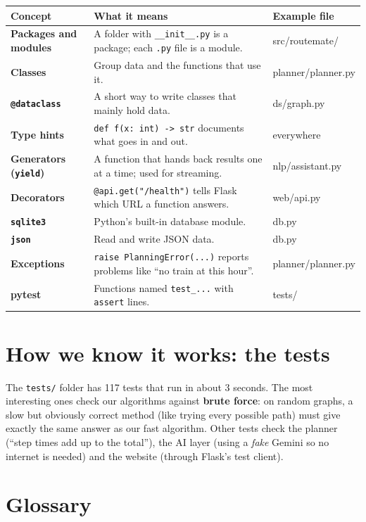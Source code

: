 \documentclass[11pt,a4paper]{article}
\newcommand{\file}[1]{\texttt{\color{accent}#1}}
\begin{document}
\begin{tabularx}{\linewidth}{@{}>{\bfseries}l X >{\ttfamily\small\color{accent}}l@{}}
\toprule
Concept & What it means & \normalfont\textbf{Example file} \\
\midrule
Packages and modules & A folder with \texttt{\_\_init\_\_.py} is a package; each \texttt{.py} file is a module. & src/routemate/ \\
Classes & Group data and the functions that use it. & planner/planner.py \\
\texttt{@dataclass} & A short way to write classes that mainly hold data. & ds/graph.py \\
Type hints & \texttt{def f(x: int) -> str} documents what goes in and out. & everywhere \\
Generators (\texttt{yield}) & A function that hands back results one at a time; used for streaming. & nlp/assistant.py \\
Decorators & \texttt{@api.get("/health")} tells Flask which URL a function answers. & web/api.py \\
\texttt{sqlite3} & Python's built-in database module. & db.py \\
\texttt{json} & Read and write JSON data. & db.py \\
Exceptions & \texttt{raise PlanningError(...)} reports problems like ``no train at this hour''. & planner/planner.py \\
pytest & Functions named \texttt{test\_...} with \texttt{assert} lines. & tests/ \\
\bottomrule
\end{tabularx}

\section{How we know it works: the tests}

The \file{tests/} folder has 117 tests that run in about 3 seconds. The most interesting ones
check our algorithms against \textbf{brute force}: on random graphs, a slow but obviously
correct method (like trying every possible path) must give exactly the same answer as our
fast algorithm. Other tests check the planner (``step times add up to the total''), the AI
layer (using a \emph{fake} Gemini so no internet is needed) and the website (through
Flask's test client).

\section{Glossary}
\end{document}
